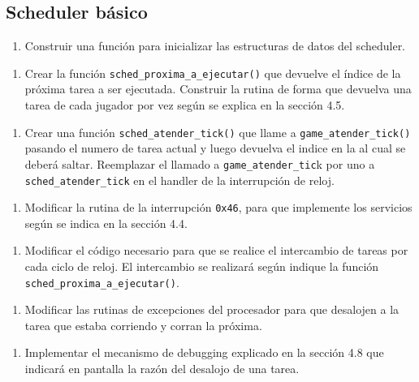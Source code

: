   \subsection{Scheduler básico}
    \begin{enumerate}[label=(\alph*)]
      \item Construir una función para inicializar las estructuras de datos del scheduler.
    \end{enumerate}

    \begin{enumerate}[resume,label=(\alph*)]
      \item Crear la función \texttt{sched\_proxima\_a\_ejecutar()} que devuelve el índice de la próxima tarea a ser ejecutada. Construir la rutina de forma que devuelva una tarea de cada jugador por vez según se explica en la sección 4.5.
    \end{enumerate}

    \begin{enumerate}[resume,label=(\alph*)]
      \item Crear una función \texttt{sched\_atender\_tick()} que llame a \texttt{game\_atender\_tick()} pasando el numero de tarea actual y luego devuelva el indice en la  al cual se deberá saltar. Reemplazar el llamado a \texttt{game\_atender\_tic}k por uno a \texttt{sched\_atender\_tick} en el handler de la interrupción de reloj.
    \end{enumerate}

    \begin{enumerate}[resume,label=(\alph*)]
      \item Modificar la rutina de la interrupción \texttt{0x46}, para que implemente los servicios según se indica en la sección 4.4.
    \end{enumerate}

    \begin{enumerate}[resume,label=(\alph*)]
      \item Modificar el código necesario para que se realice el intercambio de tareas por cada ciclo de reloj. El intercambio se realizará según indique la función \texttt{sched\_proxima\_a\_ejecutar()}.
    \end{enumerate}

    \begin{enumerate}[resume,label=(\alph*)]
      \item Modificar las rutinas de excepciones del procesador para que desalojen a la tarea que estaba corriendo y corran la próxima.
    \end{enumerate}

    \begin{enumerate}[resume,label=(\alph*)]
      \item Implementar el mecanismo de debugging explicado en la sección 4.8 que indicará en pantalla la razón del desalojo de una tarea.
    \end{enumerate}
